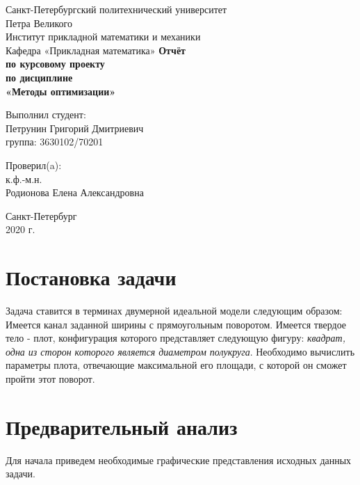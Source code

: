 \documentclass[12pt,a4paper]{article}
\begin{document}
	\begin{titlepage}
		\begin{center}		
			\vfill	
			Санкт-Петербургский политехнический университет \\
			Петра Великого\\
			\vskip 1cm
			Институт прикладной математики и механики \\
			Кафедра «Прикладная математика»
			\vfill
			\textbf{Отчёт\\
			по курсовому проекту\\
			по дисциплине\\
			«Методы оптимизации»\\}
			\vfill
		\end{center}
		\vfill
		\hfill
		\begin{minipage}{0.4\textwidth}
			Выполнил студент:\\
			Петрунин Григорий Дмитриевич\\
			группа: 3630102/70201\\
		\end{minipage}
		\vfill
		\hfill 
		\begin{minipage}{0.4\textwidth}
			Проверил(a):\\
			к.ф.-м.н.\\
			Родионова Елена Александровна\
		\end{minipage}
		\vfill
		\begin{center}
			Санкт-Петербург\\2020 г.
		\end{center}
	\end{titlepage}

	\tableofcontents
	\listoffigures
	
	\newpage
	
	\section{Постановка задачи}
		Задача ставится в терминах двумерной идеальной модели следующим образом:\\
		Имеется канал заданной ширины с прямоугольным поворотом. Имеется твердое тело - плот, конфигурация которого представляет следующую фигуру: \textit{квадрат, одна из сторон которого является диаметром полукруга}. Необходимо вычислить параметры плота, отвечающие  максимальной его площади, с которой он сможет пройти этот поворот.\\
	
	\section{Предварительный анализ}
		Для начала приведем необходимые графические представления исходных данных задачи.
		
\end{document}
